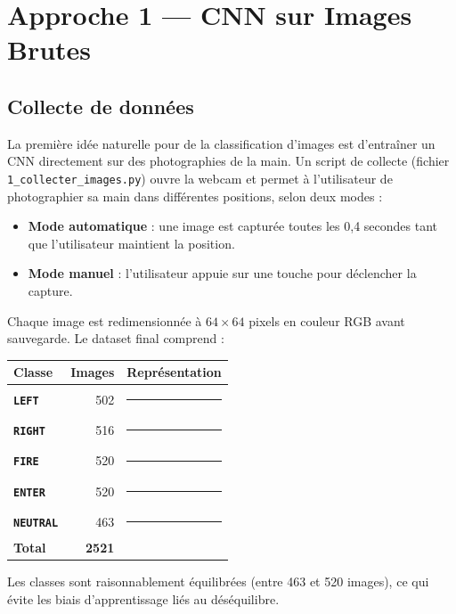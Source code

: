 \documentclass[12pt, a4paper]{article}
\newcommand{\code}[1]{\texttt{\small #1}}
\newcommand{\cls}[1]{\textbf{\texttt{#1}}}
\begin{document}
\section{Approche 1 --- CNN sur Images Brutes}
\label{sec:cnn}

\subsection{Collecte de données}

La première idée naturelle pour de la classification d'images est d'entraîner
un CNN directement sur des photographies de la main. Un script de collecte
(fichier \code{1\_collecter\_images.py}) ouvre la webcam et permet à
l'utilisateur de photographier sa main dans différentes positions, selon deux
modes :

\begin{itemize}
  \item \textbf{Mode automatique} : une image est capturée toutes les 0,4 secondes
        tant que l'utilisateur maintient la position.
  \item \textbf{Mode manuel} : l'utilisateur appuie sur une touche pour déclencher
        la capture.
\end{itemize}

Chaque image est redimensionnée à \(64 \times 64\) pixels en couleur RGB avant
sauvegarde. Le dataset final comprend :

\begin{center}
\begin{tabular}{@{}lrc@{}}
  \toprule
  \textbf{Classe} & \textbf{Images} & \textbf{Représentation} \\
  \midrule
  \cls{LEFT}    & 502 & \rule{4.5cm}{6pt} \\
  \cls{RIGHT}   & 516 & \rule{4.6cm}{6pt} \\
  \cls{FIRE}    & 520 & \rule{4.7cm}{6pt} \\
  \cls{ENTER}   & 520 & \rule{4.7cm}{6pt} \\
  \cls{NEUTRAL} & 463 & \rule{4.2cm}{6pt} \\
  \midrule
  \textbf{Total} & \textbf{2521} & \\
  \bottomrule
\end{tabular}
\end{center}

Les classes sont raisonnablement équilibrées (entre 463 et 520 images),
ce qui évite les biais d'apprentissage liés au déséquilibre.
\end{document}
